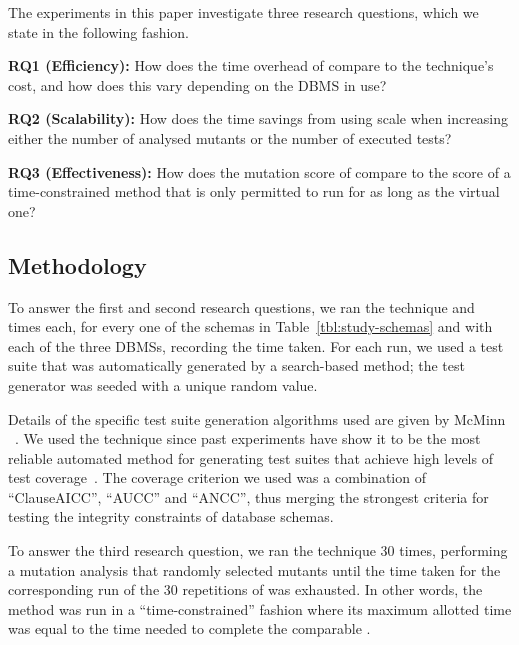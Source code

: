 The experiments in this paper investigate three research questions, which we state in the following fashion.

\vspace{5pt}

\noindent
\textbf{RQ1 (Efficiency):} How does the time overhead of \vma compare to the \Standard technique's cost, and how does
this vary depending on the DBMS in use?

\vspace{5pt}

\noindent
\textbf{RQ2 (Scalability):} How does the time savings from using \vma scale when increasing either the number
of analysed mutants or the number of executed tests?

\vspace{5pt}

\noindent
\textbf{RQ3 (Effectiveness):} How does the mutation score of \vma compare to the score of a time-constrained method that
is only permitted to run for as long as the virtual one?

\subsection{Methodology}
\label{sec:methodology}


To answer the first and second research questions, we ran the \Original technique and  times each, for every one of the schemas in Table~\ref{tbl:study-schemas} and with each of the three DBMSs, recording the time taken. For each run, we used a test suite that was automatically generated by a search-based method; the test generator was seeded with a unique random value.


Details of the specific test suite generation algorithms used are given by McMinn \etal~\cite{McMinn2015}. We used the \AVM technique since past experiments have show it to be the most reliable automated method for generating test suites that achieve high levels of test coverage~\cite{McMinn2015}. The coverage criterion we used was a combination of ``ClauseAICC'', ``AUCC'' and ``ANCC'', thus merging the strongest criteria for testing the integrity constraints of database schemas.


To answer the third research question, we ran the \Original technique 30 times, performing a mutation analysis that randomly selected mutants until the time taken for the corresponding run of the 30 repetitions of \vma was exhausted. In other words, the \Original method was run in a ``time-constrained'' fashion where its maximum allotted time was equal to the time needed to complete the comparable \vma.

